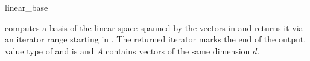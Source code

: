 \ccHtmlNoRefLinks
\begin{ccRefFunction}{linear_base}
\ccHtmlNoLinks

{computes a basis of the linear space spanned by the vectors 
in \ccc{A = tuple [first,last)} and returns it via an iterator 
range starting in . The returned iterator marks the 
end of the output.
\ccPrecond value type of  and  
is  and $A$ contains vectors of the same dimension $d$.}

\end{ccRefFunction}

